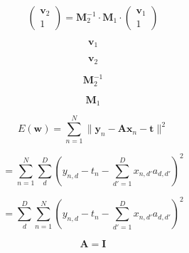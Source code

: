 \documentclass[10pt,twoside]{book}
\newcommand{\fat}[1]{\mathbf{#1}} %
\begin{document}

$$
\left(
\begin{array}{c}
\fat{v}_{2} \\
1 
\end{array}
\right)
=
\fat{M}_{2}^{-1}
\cdot
\fat{M}_{1}
\cdot
\left(
\begin{array}{c}
\fat{v}_{1} \\
1 
\end{array}
\right)
$$

$$
\fat{v}_1
$$

$$
\fat{v}_2
$$

$$
\fat{M}_{2}^{-1}
$$

$$
\fat{M}_{1}
$$


$$
E(\fat{w}) 
=
\sum_{n=1}^N \| \fat{y}_n - \fat{A} \fat{x}_n - \fat{t} \|^2
$$


$$
=
\sum_{n=1}^N \sum_{d}^D ( y_{n,d} - t_n - \sum_{d'=1}^D x_{n,d'} a_{d,d'} )^2
$$

$$
=
\sum_{d}^D \sum_{n=1}^N ( y_{n,d} - t_n - \sum_{d'=1}^D x_{n,d'} a_{d,d'} )^2
$$


$$
\fat{A} = \fat{I}
$$
\end{document}
